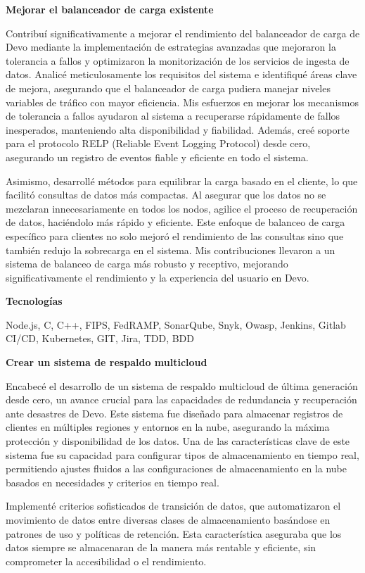\documentclass[a4paper,10pt]{article}
\newcommand{\cvsubsubsection}[1]{
\begin{tcolorbox}[colback=gray!10, colframe=gray!10, boxrule=0pt, arc=0mm, outer arc=0mm, width=\textwidth, boxsep=0pt, left=4mm, right=4mm, top=1mm, bottom=1mm]
  \textbf{#1}
\end{tcolorbox}
\vspace{1mm}
}
\newcommand{\cvsubsubsubsection}[1]{
  \begin{tcolorbox}[colback=gray!5, colframe=gray!5, boxrule=0pt, arc=0mm, outer arc=0mm, width=\textwidth, boxsep=0pt, left=6mm, right=6mm, top=1mm, bottom=1mm]
    \textbf{#1}
  \end{tcolorbox}
  \vspace{1mm}
}
\begin{document}
\cvsubsubsection{Mejorar el balanceador de carga existente}
Contribuí significativamente a mejorar el rendimiento del balanceador de carga de Devo mediante la implementación de estrategias avanzadas que mejoraron la tolerancia a fallos y optimizaron la monitorización de los servicios de ingesta de datos. Analicé meticulosamente los requisitos del sistema e identifiqué áreas clave de mejora, asegurando que el balanceador de carga pudiera manejar niveles variables de tráfico con mayor eficiencia. Mis esfuerzos en mejorar los mecanismos de tolerancia a fallos ayudaron al sistema a recuperarse rápidamente de fallos inesperados, manteniendo alta disponibilidad y fiabilidad. Además, creé soporte para el protocolo RELP (Reliable Event Logging Protocol) desde cero, asegurando un registro de eventos fiable y eficiente en todo el sistema.

Asimismo, desarrollé métodos para equilibrar la carga basado en el cliente, lo que facilitó consultas de datos más compactas. Al asegurar que los datos no se mezclaran innecesariamente en todos los nodos, agilice el proceso de recuperación de datos, haciéndolo más rápido y eficiente. Este enfoque de balanceo de carga específico para clientes no solo mejoró el rendimiento de las consultas sino que también redujo la sobrecarga en el sistema. Mis contribuciones llevaron a un sistema de balanceo de carga más robusto y receptivo, mejorando significativamente el rendimiento y la experiencia del usuario en Devo.

\cvsubsubsubsection{Tecnologías}
Node.js, C, C++, FIPS, FedRAMP, SonarQube, Snyk, Owasp, Jenkins, Gitlab CI/CD, Kubernetes, GIT, Jira, TDD, BDD

\cvsubsubsection{Crear un sistema de respaldo multicloud}
Encabecé el desarrollo de un sistema de respaldo multicloud de última generación desde cero, un avance crucial para las capacidades de redundancia y recuperación ante desastres de Devo. Este sistema fue diseñado para almacenar registros de clientes en múltiples regiones y entornos en la nube, asegurando la máxima protección y disponibilidad de los datos. Una de las características clave de este sistema fue su capacidad para configurar tipos de almacenamiento en tiempo real, permitiendo ajustes fluidos a las configuraciones de almacenamiento en la nube basados en necesidades y criterios en tiempo real.

Implementé criterios sofisticados de transición de datos, que automatizaron el movimiento de datos entre diversas clases de almacenamiento basándose en patrones de uso y políticas de retención. Esta característica aseguraba que los datos siempre se almacenaran de la manera más rentable y eficiente, sin comprometer la accesibilidad o el rendimiento.
\end{document}
